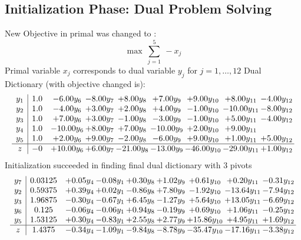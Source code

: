 \documentclass[8pt]{article}
\begin{document}
\subsection{Initialization Phase: Dual Problem Solving}
New Objective in primal was changed to : \[ \max\ \sum_{j=1}^{5}\ - x_j \] 
Primal variable $x_j$ corresponds to dual variable $y_j$ for $j = 1,\ldots,12$
Dual Dictionary (with objective changed is): 
\[\begin{array}{c| c c@{\hskip 2pt} c@{\hskip 2pt} c@{\hskip 2pt} c@{\hskip 2pt} c@{\hskip 2pt} c@{\hskip 2pt} c@{\hskip 2pt} }
 y_{1}   &  1.0 & -6.00 y_{6} & -8.00 y_{7} & +  8.00 y_{8} & +  7.00 y_{9} & +  9.00 y_{10} & +  8.00 y_{11} & -4.00 y_{12}\\
 y_{2}   &  1.0 & -4.00 y_{6} & +  3.00 y_{7} & +  2.00 y_{8} & +  4.00 y_{9} & -1.00 y_{10} & -10.00 y_{11} & -8.00 y_{12}\\
 y_{3}   &  1.0 & +  7.00 y_{6} & +  3.00 y_{7} & -1.00 y_{8} & -3.00 y_{9} & -1.00 y_{10} & +  5.00 y_{11} & -4.00 y_{12}\\
 y_{4}   &  1.0 & -10.00 y_{6} & +  8.00 y_{7} & +  7.00 y_{8} & -10.00 y_{9} & +  2.00 y_{10} & +  9.00 y_{11} &   \\
 y_{5}   &  1.0 & +  2.00 y_{6} & +  9.00 y_{7} & -2.00 y_{8} & -6.00 y_{9} & +  9.00 y_{10} & +  1.00 y_{11} & +  5.00 y_{12}\\
\hline
z    &  -0 & + 10.00 y_{6} & +  6.00 y_{7} & -21.00 y_{8} & -13.00 y_{9} & -46.00 y_{10} & -29.00 y_{11} & +  1.00 y_{12}\\
\end{array}\]
Initialization succeeded in finding final dual dictionary with 3 pivots
\[\begin{array}{c| c c@{\hskip 2pt} c@{\hskip 2pt} c@{\hskip 2pt} c@{\hskip 2pt} c@{\hskip 2pt} c@{\hskip 2pt} c@{\hskip 2pt} }
 y_{7}   &  0.03125 & +  0.05 y_{4} & -0.08 y_{1} & +  0.30 y_{8} & +  1.02 y_{9} & +  0.61 y_{10} & +  0.20 y_{11} & -0.31 y_{12}\\
 y_{2}   &  0.59375 & +  0.39 y_{4} & +  0.02 y_{1} & -0.86 y_{8} & +  7.80 y_{9} & -1.92 y_{10} & -13.64 y_{11} & -7.94 y_{12}\\
 y_{3}   &  1.96875 & -0.30 y_{4} & -0.67 y_{1} & +  6.45 y_{8} & -1.27 y_{9} & +  5.64 y_{10} & + 13.05 y_{11} & -6.69 y_{12}\\
 y_{6}   &  0.125 & -0.06 y_{4} & -0.06 y_{1} & +  0.94 y_{8} & -0.19 y_{9} & +  0.69 y_{10} & +  1.06 y_{11} & -0.25 y_{12}\\
 y_{5}   &  1.53125 & +  0.30 y_{4} & -0.83 y_{1} & +  2.55 y_{8} & +  2.77 y_{9} & + 15.86 y_{10} & +  4.95 y_{11} & +  1.69 y_{12}\\
\hline
z    &  1.4375 & -0.34 y_{4} & -1.09 y_{1} & -9.84 y_{8} & -8.78 y_{9} & -35.47 y_{10} & -17.16 y_{11} & -3.38 y_{12}\\
\end{array}\]
\end{document}
